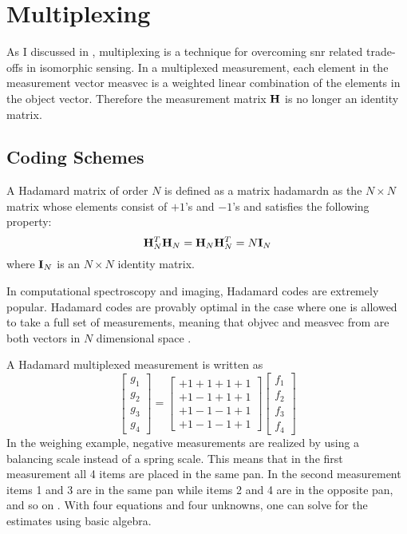 \section{Multiplexing}

As I discussed in , \gls{multiplexing} is a technique for overcoming \gls{snr} related trade-offs in \gls{isomorphic} sensing. In a multiplexed measurement, each element in the measurement vector \gls{measvec} is a weighted linear combination of the elements in the object vector. Therefore the measurement matrix $\mathbf{H}$ is no longer an identity matrix. 

\subsection{Coding Schemes}\label{subsec:codingschemes}

A Hadamard matrix of order $N$ is defined as a matrix \gls{hadamardn} as the $N \times N$ matrix whose elements consist of $+1$'s and $-1$'s and satisfies the following property:
\begin{equation}
	\mathbf{H}_{N}^T \mathbf{H}_{N} = \mathbf{H}_{N} \mathbf{H}_{N}^T = N \mathbf{I}_{N}
\end{equation}
where $\mathbf{I}_N$ is an $N \times N$ identity matrix. 

In computational spectroscopy and imaging, Hadamard codes are extremely popular. Hadamard codes are provably optimal in the case where one is allowed to take a full set of measurements, meaning that \gls{objvec} and \gls{measvec} from  are both vectors in $N$ dimensional space \cite{harwit2012hadamard}. 

A Hadamard multiplexed measurement is written as
%
\begin{equation}
\left[ \begin{matrix} g_{1}\\ g_{2}\\ g_{3}\\ g_{4}\end{matrix} \right] =\left[ \begin{matrix} +1 +1 +1 +1 \\ +1 -1 +1 +1 \\ +1 -1 -1 +1 \\ +1 -1 -1 +1 \end{matrix} \right] \left[ \begin{matrix} f_{1}\\ f_{2}\\ f_{3}\\ f_{4}\end{matrix} \right]
\end{equation}
%
In the weighing example, negative measurements are realized by using a balancing scale instead of a spring scale. This means that in the first measurement all 4 items are placed in the same pan. In the second measurement items 1 and 3 are in the same pan while items 2 and 4 are in the opposite pan, and so on \cite{harwit2012hadamard}. With four equations and four unknowns, one can solve for the estimates using basic algebra.

